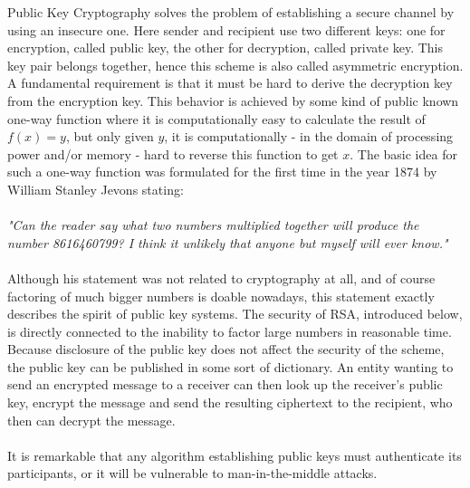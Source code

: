Public Key Cryptography solves the problem of establishing a secure channel by using an insecure one.
Here sender and recipient use two different keys: one for encryption, called public key, the other
for decryption, called private key. This key pair belongs together, hence this scheme is also called asymmetric encryption. A fundamental requirement
is that it must be hard
to derive the decryption key from the encryption key. This behavior is achieved by some kind of public known one-way function where it is computationally
easy to calculate the result of $f(x) = y$, but only given $y$, it is computationally - in the domain of processing power and/or memory - hard
to reverse this function to get $x$.
The basic idea for such a one-way function was formulated for the first time in the year 1874 by William Stanley Jevons stating:
\\
\\
\textit{"Can the reader say what two numbers multiplied together will produce the number 8616460799? I think it unlikely that anyone but myself will
ever know."} \cite{wStanley} 
\\
\\
Although his statement was not related to cryptography at all, and of course factoring of much bigger numbers is doable nowadays, this statement exactly describes
the spirit of public key systems. The security of RSA, introduced below, is directly connected to the inability to factor large numbers in reasonable time.
\\
Because disclosure of the public key does not affect the security of the scheme, the public key can be published in some sort of dictionary.
An entity wanting to send an encrypted message to a receiver can then look up the receiver's public key, encrypt the message and send the resulting
ciphertext to the recipient, who then can decrypt the message. 
\\
\\
It is remarkable that any algorithm establishing public keys must authenticate its participants, or it will be vulnerable to man-in-the-middle attacks.

